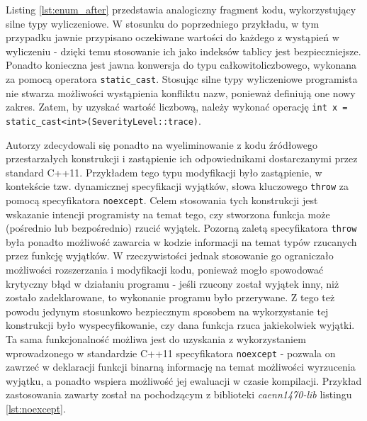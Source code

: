 

Listing \ref{lst:enum_after} przedstawia analogiczny fragment kodu, wykorzystujący silne typy wyliczeniowe. W stosunku do poprzedniego przykładu, w tym przypadku jawnie przypisano oczekiwane wartości do każdego z wystąpień w wyliczeniu - dzięki temu stosowanie ich jako indeksów tablicy jest bezpieczniejsze. Ponadto konieczna jest jawna konwersja do typu całkowitoliczbowego, wykonana za pomocą operatora \lstinline{static_cast}. Stosując silne typy wyliczeniowe programista nie stwarza możliwości wystąpienia konfliktu nazw, ponieważ definiują one nowy zakres. Zatem, by uzyskać wartość liczbową, należy wykonać operację \lstinline{int x = static_cast<int>(SeverityLevel::trace)}.



Autorzy zdecydowali się ponadto na wyeliminowanie z kodu źródłowego przestarzałych konstrukcji i zastąpienie ich odpowiednikami dostarczanymi przez standard C++11. Przykładem tego typu 
modyfikacji było zastąpienie, w kontekście tzw. dynamicznej specyfikacji wyjątków, słowa kluczowego \lstinline{throw} za pomocą specyfikatora \lstinline{noexcept}. Celem stosowania tych konstrukcji jest wskazanie intencji programisty na temat tego, czy stworzona funkcja może (pośrednio lub bezpośrednio) rzucić wyjątek. Pozorną zaletą specyfikatora \lstinline{throw} była ponadto możliwość zawarcia w kodzie informacji na temat typów rzucanych przez funkcję wyjątków. W rzeczywistości jednak stosowanie go ograniczało możliwości rozszerzania i modyfikacji kodu, ponieważ mogło spowodować krytyczny błąd w działaniu programu - jeśli rzucony został wyjątek inny, niż zostało zadeklarowane, to wykonanie programu było przerywane. Z tego też powodu jedynym stosunkowo bezpiecznym sposobem na wykorzystanie tej konstrukcji było wyspecyfikowanie, czy dana funkcja rzuca jakiekolwiek wyjątki. Ta sama funkcjonalność możliwa jest do uzyskania z wykorzystaniem wprowadzonego w standardzie C++11 specyfikatora \lstinline{noexcept} - pozwala on zawrzeć w deklaracji funkcji binarną informację na temat możliwości wyrzucenia wyjątku, a ponadto wspiera możliwość jej ewaluacji w czasie kompilacji. Przykład zastosowania zawarty został na pochodzącym z biblioteki \emph{caenn1470-lib} listingu \ref{lst:noexcept}. 

